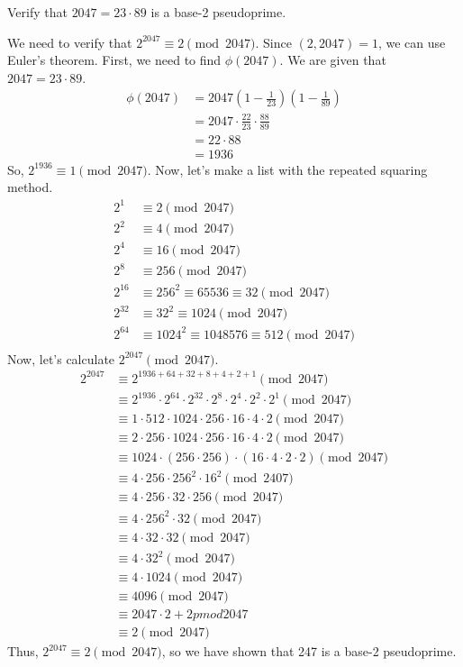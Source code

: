 \documentclass{article}
\begin{document}
\begin{problem}{}{}
    Verify that $2047=23\cdot89$ is a base-2 pseudoprime.
\end{problem}
\begin{solution}{}{}
    We need to verify that $2^{2047} \equiv 2 \pmod{2047}$. Since $(2,2047) = 1$, we can use Euler's theorem. First, we need to find $\phi(2047)$. We are given that $2047 = 23 \cdot 89$.
    \begin{align*}
        \phi(2047) &= 2047 \left(1 - \frac{1}{23}\right)\left(1 - \frac{1}{89}\right) \\
        &= 2047 \cdot \frac{22}{23} \cdot \frac{88}{89} \\
        &= 22\cdot88 \\
        &= 1936
    \end{align*}
    So, $2^{1936} \equiv 1 \pmod{2047}$. Now, let's make a list with the repeated squaring method.
    \begin{align*}
        2^1 &\equiv 2 \pmod{2047} \\
        2^2 &\equiv 4 \pmod{2047} \\
        2^4 &\equiv 16 \pmod{2047} \\
        2^8 &\equiv 256 \pmod{2047} \\
        2^{16} &\equiv 256^2\equiv 65536 \equiv 32 \pmod{2047} \\
        2^{32} &\equiv 32^2 \equiv 1024 \pmod{2047} \\
        2^{64} &\equiv 1024^2 \equiv 1048576 \equiv 512 \pmod{2047} \\
    \end{align*}
    Now, let's calculate $2^{2047}\pmod{2047}$.
    \begin{align*}
        2^{2047} &\equiv 2^{1936+64+32+8+4+2+1} \pmod{2047} \\
        &\equiv 2^{1936} \cdot 2^{64} \cdot 2^{32} \cdot 2^8 \cdot 2^4 \cdot 2^2 \cdot 2^1 \pmod{2047} \\
        &\equiv 1 \cdot 512 \cdot 1024 \cdot 256 \cdot 16 \cdot 4 \cdot 2 \pmod{2047} \\
        &\equiv 2\cdot 256\cdot 1024 \cdot 256 \cdot 16 \cdot 4 \cdot 2 \pmod{2047} \\
        &\equiv 1024\cdot(256\cdot 256)\cdot(16\cdot4\cdot2\cdot2)\pmod{2047} \\
        &\equiv 4\cdot256\cdot256^2\cdot16^2\pmod{2407} \\
        &\equiv 4\cdot256\cdot32\cdot256\pmod{2047} \\
        &\equiv 4\cdot256^2\cdot32\pmod{2047} \\
        &\equiv 4\cdot32\cdot32\pmod{2047} \\
        &\equiv 4\cdot32^2\pmod{2047} \\
        &\equiv 4\cdot1024\pmod{2047} \\
        &\equiv 4096\pmod{2047} \\
        &\equiv 2047\cdot2+2pmod{2047} \\
        &\equiv 2\pmod{2047}
    \end{align*}
    Thus, $2^{2047} \equiv 2 \pmod{2047}$, so we have shown that 247 is a base-2 pseudoprime.
\end{solution}
\end{document}
